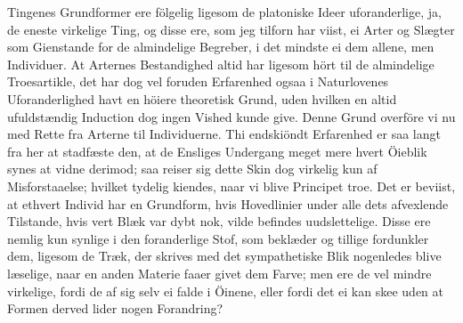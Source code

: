 \documentclass[12pt,a4paper]{article}
\newcommand{\opage}[1]{\marginnote{\footnotesize\textit{[#1]}}}
\begin{document}
Tingenes Grundformer ere fölgelig ligesom de platoniske Ideer
uforanderlige, ja, de eneste virkelige Ting, og disse
\opage{249} ere, som jeg tilforn har viist, ei Arter og Slægter som Gienstande for de
almindelige Begreber, i det mindste ei dem allene, men Individuer. At
Arternes Bestandighed altid har ligesom hört til de almindelige
Troesartikle, det har dog vel foruden Erfarenhed ogsaa i Naturlovenes
Uforanderlighed havt en höiere theoretisk Grund, uden hvilken en altid
ufuldstændig Induction dog ingen Vished kunde give. Denne Grund overföre vi
nu med Rette fra Arterne til Individuerne. Thi endskiöndt Erfarenhed er saa
langt fra her at stadfæste den, at de Ensliges Undergang meget mere hvert
Öieblik synes at vidne derimod; saa reiser sig dette Skin dog virkelig kun
af Misforstaaelse; hvilket tydelig kiendes, naar vi blive Principet troe.
Det er beviist, at ethvert Individ har en Grundform, hvis Hovedlinier under
alle dets afvexlende Tilstande, hvis vert Blæk var dybt nok, vilde befindes
uudslettelige. Disse ere nemlig kun synlige i den foranderlige Stof, som
beklæder og tillige fordunkler dem, ligesom de Træk, der skrives med det
sympathetiske Blik nogenledes blive læselige, naar en anden Materie faaer
givet dem Farve; men ere de vel mindre virkelige, fordi de af sig selv ei
falde i Öinene, eller fordi det ei kan skee uden at Formen derved lider
nogen Forandring?
\end{document}
